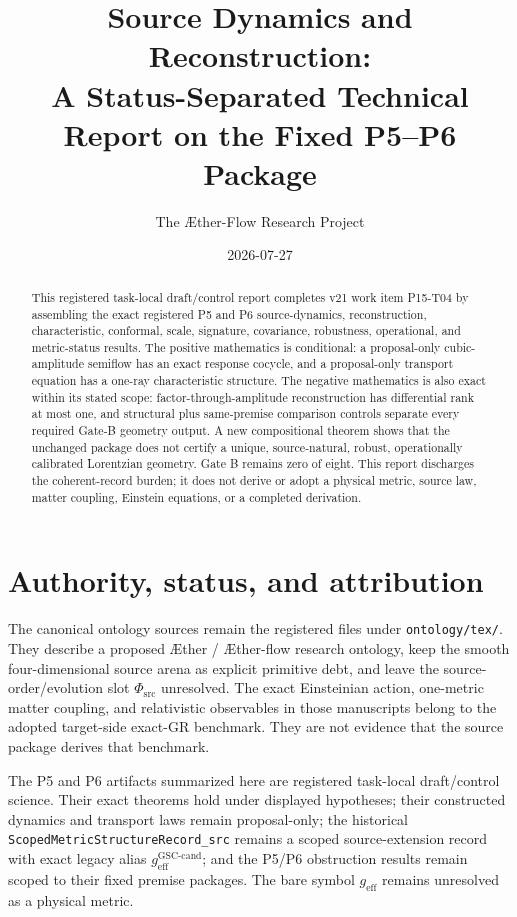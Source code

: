 \documentclass[11pt]{article}
\title{Source Dynamics and Reconstruction:\\
\large A Status-Separated Technical Report on the Fixed P5--P6 Package}
\author{The \AE ther-Flow Research Project}
\date{2026-07-27}
\newcommand{\Phisrc}{\Phi_{\mathrm{src}}}
\begin{document}
\maketitle

\begin{abstract}
This registered task-local draft/control report completes v21 work item
P15-T04 by assembling the exact registered P5 and P6 source-dynamics,
reconstruction, characteristic, conformal, scale, signature, covariance,
robustness, operational, and metric-status results.  The positive mathematics
is conditional: a proposal-only cubic-amplitude semiflow has an exact response
cocycle, and a proposal-only transport equation has a one-ray characteristic
structure.  The negative mathematics is also exact within its stated scope:
factor-through-amplitude reconstruction has differential rank at most one,
and structural plus same-premise comparison controls separate every required
Gate-B geometry output.  A new compositional theorem shows that the unchanged package
does not certify a unique, source-natural, robust, operationally calibrated
Lorentzian geometry.  Gate B remains zero of eight.  This report discharges
the coherent-record burden; it does not derive or adopt a physical metric,
source law, matter coupling, Einstein equations, or a completed derivation.
\end{abstract}

\section{Authority, status, and attribution}

The canonical ontology sources remain the registered files under
\texttt{ontology/tex/}.  They describe a proposed \AE ther{} /
\AE ther-flow research ontology, keep the smooth four-dimensional source
arena as explicit primitive debt, and leave the source-order/evolution slot
\(\Phisrc\) unresolved.  The exact Einsteinian action, one-metric matter
coupling, and relativistic observables in those manuscripts belong to the
adopted target-side exact-GR benchmark.  They are not evidence that the source
package derives that benchmark.

The P5 and P6 artifacts summarized here are registered task-local
draft/control science.  Their exact theorems hold under displayed hypotheses;
their constructed dynamics and transport laws remain proposal-only; the
historical \texttt{ScopedMetricStructureRecord\_src} remains a scoped
source-extension record with exact legacy alias
\(g_{\mathrm{eff}}^{\mathrm{GSC\mbox{-}cand}}\); and the P5/P6 obstruction
results remain scoped to their fixed premise packages.  The bare symbol
\(g_{\mathrm{eff}}\) remains unresolved as a physical metric.
\end{document}

